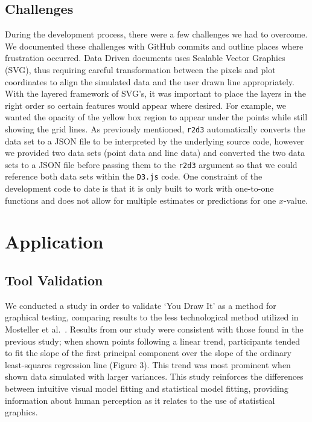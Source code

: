 \documentclass[10pt]{article}
\begin{document}
\subsection{Challenges}

During the development process, there were a few challenges we had to
overcome. We documented these challenges with GitHub commits and outline
places where frustration occurred. Data Driven documents uses Scalable
Vector Graphics (SVG), thus requiring careful transformation between the
pixels and plot coordinates to align the simulated data and the user
drawn line appropriately. With the layered framework of SVG's, it was
important to place the layers in the right order so certain features
would appear where desired. For example, we wanted the opacity of the
yellow box region to appear under the points while still showing the
grid lines. As previously mentioned, \texttt{r2d3} automatically
converts the data set to a JSON file to be interpreted by the underlying
source code, however we provided two data sets (point data and line
data) and converted the two data sets to a JSON file before passing them
to the \texttt{r2d3} argument so that we could reference both data sets
within the \texttt{D3.js} code. One constraint of the development code
to date is that it is only built to work with one-to-one functions and
does not allow for multiple estimates or predictions for one
\(x\)-value.

\section{Application}

\subsection{Tool Validation}

We conducted a study in order to validate `You Draw It' as a method for
graphical testing, comparing results to the less technological method
utilized in Mosteller et al.~. Results from
our study were consistent with those found in the previous study; when
shown points following a linear trend, participants tended to fit the
slope of the first principal component over the slope of the ordinary
least-squares regression line (Figure 3). This trend was most prominent
when shown data simulated with larger variances. This study reinforces
the differences between intuitive visual model fitting and statistical
model fitting, providing information about human perception as it
relates to the use of statistical graphics.
\end{document}
